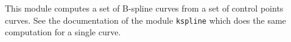 This module computes a set of B-spline curves from a set of
control points curves.
See the documentation of the module \verb+kspline+ which does the
same computation for a single curve.

